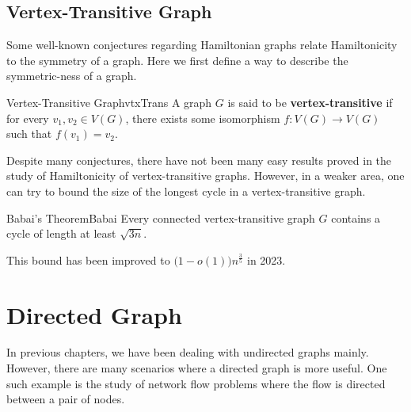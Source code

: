 \documentclass[math]{amznotes}
\theoremstyle{remark}
\begin{document}
\section{Vertex-Transitive Graph}
Some well-known conjectures regarding Hamiltonian graphs relate Hamiltonicity to the symmetry of a graph. Here we first define a way to describe the symmetric-ness of a graph.
\begin{dfnbox}{Vertex-Transitive Graph}{vtxTrans}
    A graph $G$ is said to be {\color{red} \textbf{vertex-transitive}} if for every $v_1, v_2 \in V(G)$, there exists some isomorphism $f \colon V(G) \to V(G)$ such that $f(v_1) = v_2$.
\end{dfnbox}
Despite many conjectures, there have not been many easy results proved in the study of Hamiltonicity of vertex-transitive graphs. However, in a weaker area, one can try to bound the size of the longest cycle in a vertex-transitive graph.
\begin{thmbox}{Babai's Theorem}{Babai}
    Every connected vertex-transitive graph $G$ contains a cycle of length at least $\sqrt{3n}$.
\end{thmbox}
This bound has been improved to $\bigl(1 - o(1)\bigr)n^{\frac{3}{5}}$ in 2023.
\chapter{Directed Graph}
In previous chapters, we have been dealing with undirected graphs mainly. However, there are many scenarios where a directed graph is more useful. One such example is the study of network flow problems where the flow is directed between a pair of nodes.
\end{document}
